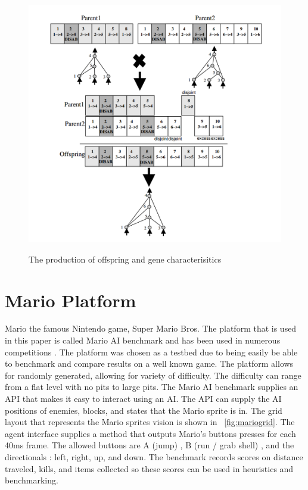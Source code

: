 \documentclass[12pt]{ucthesis} \newif\ifpdf \ifx\pdfoutput\undefined
\begin{document}
\begin{figure}[h!] 
\caption{The production of offspring and gene characterisitics
\cite{stanley:phd04}}
  \centering
    \includegraphics[width=1\textwidth]{parentgenes.png}
   \label{fig:parentgenes}
\end{figure}


\section{Mario Platform}
Mario the famous Nintendo game, Super Mario Bros.  The platform
that is used in this paper is called Mario AI benchmark and has been used in
numerous competitions \cite{karakovskiy2012mario}. The platform was chosen as a
testbed due to being easily be able to benchmark and compare results on a well
known game. The platform allows for randomly generated, allowing for variety of
difficulty. The difficulty can range from a flat level with no pits to large
pits. The Mario AI benchmark supplies an API that makes it easy to interact
using an AI. The API can supply the AI positions of enemies, blocks, and states
that the Mario sprite is in. The grid layout that represents the Mario sprites
vision is shown in ~\ref{fig:mariogrid}. The agent interface supplies a method
that outputs Mario’s buttons presses for each 40ms frame. The allowed buttons
are A (jump) , B (run / grab shell) , and the directionals : left, right, up,
and down. The benchmark records scores on distance traveled, kills, and items
collected so these scores can be used in heuristics and benchmarking.
\end{document}
